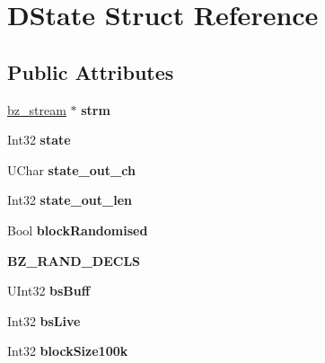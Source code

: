 \hypertarget{structDState}{\section{D\-State Struct Reference}
\label{structDState}
}
\subsection*{Public Attributes}
\begin{DoxyCompactItemize}
\item 
\hypertarget{structDState_a083c2502fe1db2e0903cccb4de54efd1}{\hyperlink{structbz__stream}{bz\-\_\-stream} $\ast$ {\bfseries strm}}\label{structDState_a083c2502fe1db2e0903cccb4de54efd1}

\item 
\hypertarget{structDState_a70a740d52793a3933adfc46aeb3f41cb}{Int32 {\bfseries state}}\label{structDState_a70a740d52793a3933adfc46aeb3f41cb}

\item 
\hypertarget{structDState_aae326a8636a1e915486845b618582251}{U\-Char {\bfseries state\-\_\-out\-\_\-ch}}\label{structDState_aae326a8636a1e915486845b618582251}

\item 
\hypertarget{structDState_a692445b35df22bc814c264fbe3ed7fda}{Int32 {\bfseries state\-\_\-out\-\_\-len}}\label{structDState_a692445b35df22bc814c264fbe3ed7fda}

\item 
\hypertarget{structDState_af18fc51a50bcba9c8badb3a432b124c9}{Bool {\bfseries block\-Randomised}}\label{structDState_af18fc51a50bcba9c8badb3a432b124c9}

\item 
\hypertarget{structDState_a8c81979baebe9aed6d761d121dbb9066}{{\bfseries B\-Z\-\_\-\-R\-A\-N\-D\-\_\-\-D\-E\-C\-L\-S}}\label{structDState_a8c81979baebe9aed6d761d121dbb9066}

\item 
\hypertarget{structDState_ac8a8f1e3f3db538611317d24562ba0d8}{U\-Int32 {\bfseries bs\-Buff}}\label{structDState_ac8a8f1e3f3db538611317d24562ba0d8}

\item 
\hypertarget{structDState_ac366e057d6ff7173a2d2308d78e37cf7}{Int32 {\bfseries bs\-Live}}\label{structDState_ac366e057d6ff7173a2d2308d78e37cf7}

\item 
\hypertarget{structDState_ad0c76b25a2fdfb322db831658bbc41a7}{Int32 {\bfseries block\-Size100k}}\label{structDState_ad0c76b25a2fdfb322db831658bbc41a7}


\end{DoxyCompactItemize}
